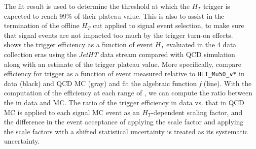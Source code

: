 The fit result is used to determine the threshold at which the $H_T$ trigger is expected to reach 99\% of their plateau value. This is also to assist in the termination of the offline $H_T$ cut applied to signal event selection, to make sure that signal events are not impacted too much by the trigger turn-on effects.  shows the trigger efficiency as a function of event $H_T$ evaluated in the 4 data collection eras using the \textit{JetHT} data stream compared with QCD simulation along with an estimate of the trigger plateau value.
More specifically,  compare efficiency for \HT trigger as a function of event \HT measured relative to \verb|HLT_Mu50_v*| in data (black) and QCD MC (gray) and fit the algebraic function \textit{f} (line). With the computation of the efficiency at each range of \HT, we can compute the ratio between the \HT in data and MC. The ratio of the trigger efficiency in data vs. that in QCD MC is applied to each signal MC event as an $H_T$-dependent scaling factor, and the difference in the event acceptance of applying the scale factor and applying the scale factors with a shifted statistical uncertainty is treated as its systematic uncertainty.

